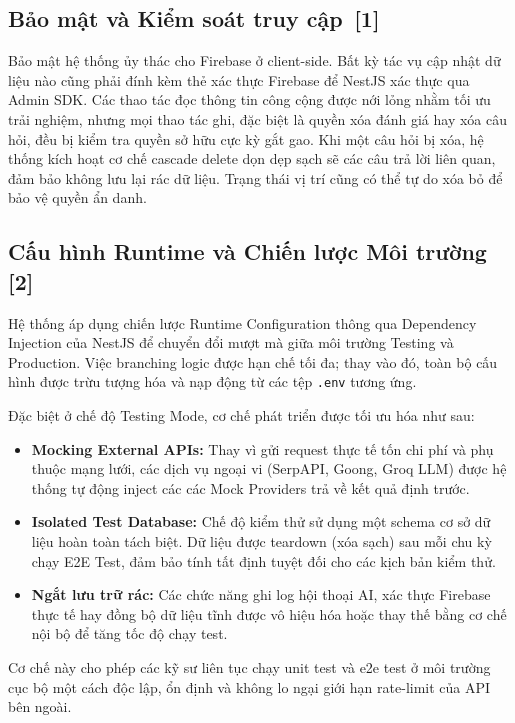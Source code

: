 \documentclass[12pt, a4paper]{article}
\begin{document}
\subsection[Bảo mật và Kiểm soát truy cập]{Bảo mật và Kiểm soát truy cập \,{\normalfont\small\textcolor{cyan!70!black}{[1]}}}
Bảo mật hệ thống ủy thác cho Firebase ở client-side. Bất kỳ tác vụ cập nhật dữ liệu nào cũng phải đính kèm thẻ xác thực Firebase để NestJS xác thực qua Admin SDK. Các thao tác đọc thông tin công cộng được nới lỏng nhằm tối ưu trải nghiệm, nhưng mọi thao tác ghi, đặc biệt là quyền xóa đánh giá hay xóa câu hỏi, đều bị kiểm tra quyền sở hữu cực kỳ gắt gao. Khi một câu hỏi bị xóa, hệ thống kích hoạt cơ chế cascade delete dọn dẹp sạch sẽ các câu trả lời liên quan, đảm bảo không lưu lại rác dữ liệu. Trạng thái vị trí cũng có thể tự do xóa bỏ để bảo vệ quyền ẩn danh.

\subsection[Cấu hình Runtime và Chiến lược Môi trường]{Cấu hình Runtime và Chiến lược Môi trường \,{\normalfont\small\textcolor{cyan!70!black}{[2]}}}

Hệ thống áp dụng chiến lược Runtime Configuration thông qua Dependency Injection của NestJS để chuyển đổi mượt mà giữa môi trường Testing và Production. Việc branching logic được hạn chế tối đa; thay vào đó, toàn bộ cấu hình được trừu tượng hóa và nạp động từ các tệp \texttt{.env} tương ứng. 

Đặc biệt ở chế độ Testing Mode, cơ chế phát triển được tối ưu hóa như sau:
\begin{itemize}
    \item \textbf{Mocking External APIs:} Thay vì gửi request thực tế tốn chi phí và phụ thuộc mạng lưới, các dịch vụ ngoại vi (SerpAPI, Goong, Groq LLM) được hệ thống tự động inject các các Mock Providers trả về kết quả định trước. 
    \item \textbf{Isolated Test Database:} Chế độ kiểm thử sử dụng một schema cơ sở dữ liệu hoàn toàn tách biệt. Dữ liệu được teardown (xóa sạch) sau mỗi chu kỳ chạy E2E Test, đảm bảo tính tất định tuyệt đối cho các kịch bản kiểm thử.
    \item \textbf{Ngắt lưu trữ rác:} Các chức năng ghi log hội thoại AI, xác thực Firebase thực tế hay đồng bộ dữ liệu tĩnh được vô hiệu hóa hoặc thay thế bằng cơ chế nội bộ để tăng tốc độ chạy test.
\end{itemize}

Cơ chế này cho phép các kỹ sư liên tục chạy unit test và e2e test ở môi trường cục bộ một cách độc lập, ổn định và không lo ngại giới hạn rate-limit của API bên ngoài.
\end{document}
